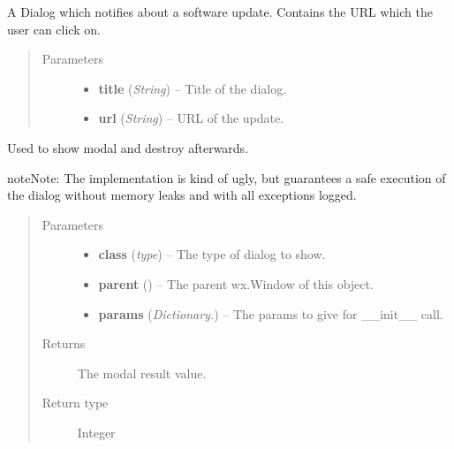 \documentclass[letterpaper,10pt,english]{sphinxmanual}
\begin{document}
\begin{fulllineitems}
\label{dialogs:dialogs.UpdateDialog}
A Dialog which notifies about a software update.
Contains the URL which the user can click on.
\begin{quote}\begin{description}
\item[{Parameters}] \leavevmode\begin{itemize}
\item {} 
\textbf{title} (\emph{String}) -- Title of the dialog.

\item {} 
\textbf{url} (\emph{String}) -- URL of the update.

\end{itemize}

\end{description}\end{quote}

\end{fulllineitems}


\begin{fulllineitems}
\label{dialogs:dialogs.show_modal_and_destroy}
Used to show modal and destroy afterwards.

\begin{notice}{note}{Note:}
The implementation is kind of ugly, but guarantees a safe execution
of the dialog without memory leaks and with all exceptions logged.
\end{notice}
\begin{quote}\begin{description}
\item[{Parameters}] \leavevmode\begin{itemize}
\item {} 
\textbf{class} (\emph{type}) -- The type of dialog to show.

\item {} 
\textbf{parent} () -- The parent wx.Window of this object.

\item {} 
\textbf{params} (\emph{Dictionary.}) -- The params to give for \_\_init\_\_ call.

\end{itemize}

\item[{Returns}] \leavevmode
The modal result value.

\item[{Return type}] \leavevmode
Integer

\end{description}\end{quote}

\end{fulllineitems}
\end{document}
